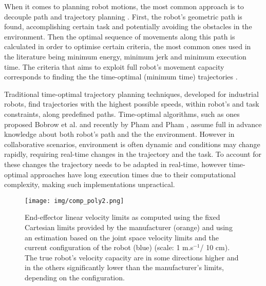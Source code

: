 
When it comes to planning robot motions, the most common approach is to decouple path and trajectory planning \cite{Pardo1996}. First, the robot's geometric path is found, accomplishing certain task and potentially avoiding the obstacles in the environment. Then the optimal sequence of movements along this path is calculated in order to optimise certain criteria, the most common ones used in the literature being minimum energy, minimum jerk and minimum execution time. The criteria that aims to exploit full robot's movement capacity corresponds to finding the the time-optimal (minimum time) trajectories \cite{gasparetto2012trajectory}. 

Traditional time-optimal trajectory planning techniques, developed for industrial robots, find trajectories with the highest possible speeds, within robot's and task constraints, along predefined paths. Time-optimal algorithms, such as ones proposed Bobrow et al. \cite{bobrow1985time} and recently by Pham and Pham \cite{Pham2018}, assume full in advance knowledge about both robot's path and the the environment. However in collaborative scenarios, environment is often dynamic and conditions may change rapidly, requiring real-time changes in the trajectory and the task. To account for these changes the trajectory needs to be adapted in real-time, however time-optimal approaches have long execution times due to their computational complexity, making such implementations unpractical. 


\begin{figure}[!t]
    \centering
    \texttt{[image: img/comp\_poly2.png]}
    \caption{End-effector linear velocity limits as computed using the fixed Cartesian limits provided by the manufacturer (orange) and using an estimation based on the joint space velocity limits and the current configuration of the robot (blue) (scale: 1 m.s$^{-1}$/ 10 cm). The true robot's velocity capacity are in some directions higher and in the others significantly lower than the manufacturer's limits, depending on the configuration.}
    \label{fig:comp_cube_poly}
\end{figure}



